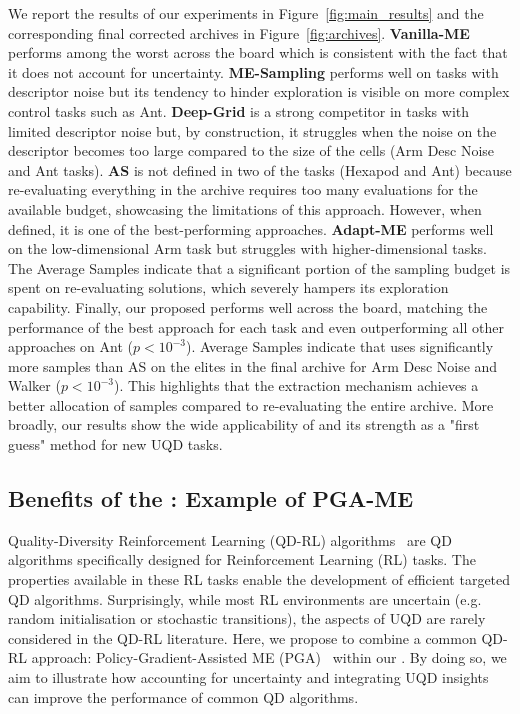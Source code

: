 We report the results of our experiments in Figure~\ref{fig:main_results} and the corresponding final corrected archives in Figure~\ref{fig:archives}. 
\textbf{Vanilla-ME} performs among the worst across the board which is consistent with the fact that it does not account for uncertainty. 
\textbf{ME-Sampling} performs well on tasks with descriptor noise but its tendency to hinder exploration is visible on more complex control tasks such as Ant.  
\textbf{Deep-Grid} is a strong competitor in tasks with limited descriptor noise but, by construction, it struggles when the noise on the descriptor becomes too large compared to the size of the cells (Arm Desc Noise and Ant tasks). 
\textbf{AS} is not defined in two of the tasks (Hexapod and Ant) because re-evaluating everything in the archive requires too many evaluations for the available budget, showcasing the limitations of this approach. However, when defined, it is one of the best-performing approaches. 
\textbf{Adapt-ME} performs well on the low-dimensional Arm task but struggles with higher-dimensional tasks. The Average Samples indicate that a significant portion of the sampling budget is spent on re-evaluating solutions, which severely hampers its exploration capability. 
Finally, our proposed \textbf{\name{}} performs well across the board, matching the performance of the best approach for each task and even outperforming all other approaches on Ant ($p<10^{-3}$). 
Average Samples indicate that \name{} uses significantly more samples than AS on the elites in the final archive for Arm Desc Noise and Walker ($p<10^{-3}$). This highlights that the extraction mechanism achieves a better allocation of samples compared to re-evaluating the entire archive.
More broadly, our results show the wide applicability of \name{} and its strength as a "first guess" method for new UQD tasks. 


\subsection{Benefits of the \Longframework{}: Example of PGA-ME} \label{sec:results_qdrl}

Quality-Diversity Reinforcement Learning (QD-RL) algorithms~\cite{tjanaka2022approximating, pierrot2022diversity, nilsson2021policy, faldor2023synergizing, tjanaka2023training} are QD algorithms specifically designed for Reinforcement Learning (RL) tasks. The properties available in these RL tasks enable the development of efficient targeted QD algorithms. 
Surprisingly, while most RL environments are uncertain (e.g. random initialisation or stochastic transitions), the aspects of UQD are rarely considered in the QD-RL literature.
Here, we propose to combine a common QD-RL approach: Policy-Gradient-Assisted ME (PGA)~\cite{nilsson2021policy} within our \framework{}. 
By doing so, we aim to illustrate how accounting for uncertainty and integrating UQD insights can improve the performance of common QD algorithms.

